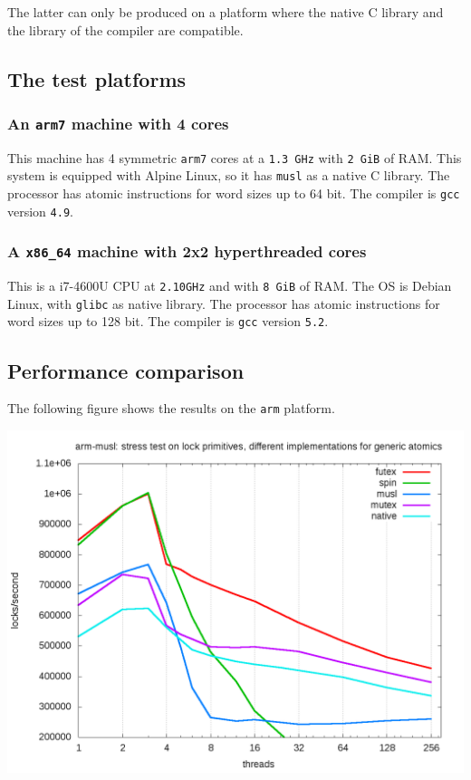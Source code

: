 The latter can only be produced on a platform where the native C
library and the library of the compiler are compatible.

\subsection{The test platforms}
\label{sec-4-3}

\subsubsection{An \texttt{arm7} machine with 4 cores}
\label{sec-4-3-1}

This machine has 4 symmetric \texttt{arm7} cores at a \texttt{1.3 GHz} with \texttt{2
    GiB} of RAM. This system is equipped with Alpine Linux, so it has
\texttt{musl} as a native C library. The processor has atomic
instructions for word sizes up to 64 bit. The compiler is \texttt{gcc}
version \texttt{4.9}.

\subsubsection{A \texttt{x86\_64} machine with 2x2 hyperthreaded cores}
\label{sec-4-3-2}

This is a i7-4600U CPU at \texttt{2.10GHz} and with \texttt{8 GiB} of RAM. The
OS is Debian Linux, with \texttt{glibc} as native library.  The processor
has atomic instructions for word sizes up to 128 bit. The compiler
is \texttt{gcc} version \texttt{5.2}.

\subsection{Performance comparison}
\label{sec-4-4}

The following figure shows the results on the \texttt{arm}
platform.\itemadjust


\begin{center}
\includegraphics[width=0.95\linewidth]{benchs/arm/test-arm-u64.png}
\end{center}

